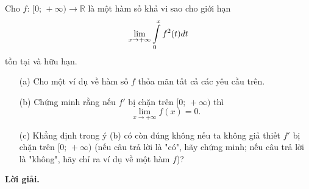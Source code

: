 \begin{tcolorbox}[title=\textbf{Bài toán A.5.},breakable]
    Cho $f:\,[0;\,+\infty) \to \mathbb{R}$ là một hàm số khả vi sao cho giới hạn $$\lim\limits_{x \to +\infty} \int\displaylimits_{0}^{x}f^2(t)dt$$ tồn tại và hữu hạn.

    \begin{enumerate}
        \item[(a)] {Cho một ví dụ về hàm số $f$ thỏa mãn tất cả các yêu cầu trên.}
        \item[(b)] {Chứng minh rằng nếu $f'$ bị chặn trên $[0;\,+\infty)$ thì $$\lim\limits_{x \to +\infty}f(x) = 0.$$}  
        \item[(c)] {Khẳng định trong ý (b) có còn đúng không nếu ta không giả thiết $f'$ bị chặn trên $[0;\,+\infty)$ (nếu câu trả lời là "có", hãy chứng minh; nếu câu trả lời là "không", hãy chỉ ra ví dụ về một hàm $f$)?}
    \end{enumerate}
\end{tcolorbox}

\textbf{Lời giải. }